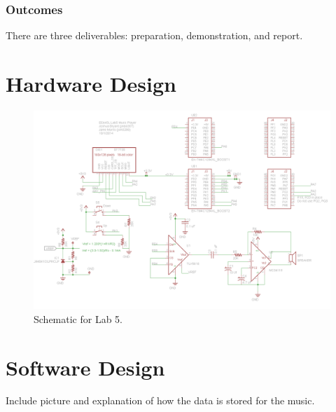 \documentclass{article}
\begin{document}
		\subsubsection{Outcomes}
			There are three deliverables: preparation, demonstration, and report.

 
\section{Hardware Design}
	\begin{figure}[h]
		\includegraphics[keepaspectratio, width=\textwidth]{Lab5Graphics/FinalSchematic.png}
		\caption{Schematic for Lab 5.}
	\end{figure}

\section{Software Design}
	Include picture and explanation of how the data is stored for the music.



\end{document}
